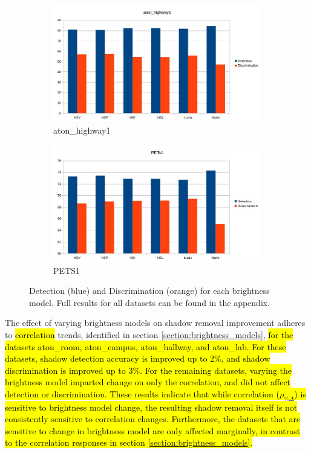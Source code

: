 \documentclass[12pt]{report}
\begin{document}
\begin{figure}
\centering
  \begin{subfigure}{1\linewidth}
  \includegraphics[width=1\linewidth]{figures/model/highway1_all_brightness_models.jpg}
  \caption{aton\_highway1}
\end{subfigure}
\hfill
  \begin{subfigure}{1\linewidth}
  \includegraphics[width=1\linewidth]{figures/model/pets1_all_brightness_models.jpg}
  \caption{PETS1}
\end{subfigure}
\caption{Detection (blue) and Discrimination (orange) for each brightness model. Full results for all datasets can be found in the appendix.}
\label{fig:pets1_bars_calc_all}
\end{figure}

The effect of varying brightness models on shadow removal improvement adheres to \hl{correlation} trends, identified in section \ref{section:brightness_models}, \hl{for the datasets aton\_room, aton\_campus, aton\_hallway, and aton\_lab. For these datasets, shadow detection accuracy is improved up to 2\%, and shadow discrimination is improved up to 3\%. For the remaining datasets, varying the brightness model imparted change on only the correlation, and did not affect detection or discrimination. These results indicate that while correlation ($\rho_{\%\Delta}$) is sensitive to brightness model change, the resulting shadow removal itself is not consistently sensitive to correlation changes. Furthermore, the datasets that are sensitive to change in brightness model are only affected marginally, in contrast to the correlation responses in section \ref{section:brightness_models}.}
\end{document}
